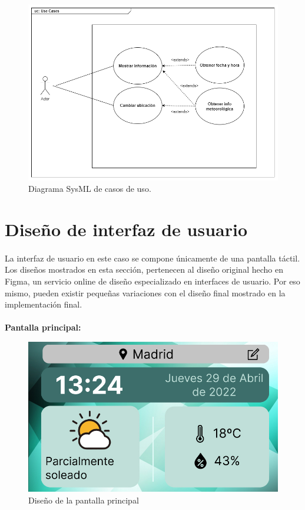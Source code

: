 \begin{figure}[H]
	\centering
	\includegraphics[width=0.9\linewidth]{figs/rpi_weather-uc}
	\caption[Diagrama SysML de casos de uso]{Diagrama SysML de casos de uso.}
	\label{fig:use_cases}
\end{figure}

\section{Diseño de interfaz de usuario}

\paragraph{}La interfaz de usuario en este caso se compone únicamente de una pantalla
táctil. Los diseños mostrados en esta sección, pertenecen al diseño original hecho en
Figma, un servicio online de diseño especializado en interfaces de usuario. Por eso mismo,
pueden existir pequeñas variaciones con el diseño final mostrado en la implementación final.

\paragraph{}\textbf{Pantalla principal:}

\begin{figure}[H]
	\centering
	\includegraphics[width=0.75\linewidth]{imgs/figma-main}
	\caption[Diseño de la pantalla principal]{Diseño de la pantalla principal}
	\label{fig:design_main_screen}
\end{figure}

